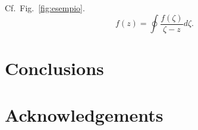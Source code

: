 \documentclass[MSc]{podunipdthesis}
\begin{document}
Cf.\ Fig.~\ref{fig:esempio}.
\lipsum[30]
\begin{equation}
f(z) = \oint \frac{f(\zeta)}{\zeta - z} d\zeta .
\end{equation}
\lipsum[10]

\chapter*{Conclusions}

\lipsum[20]




\chapter*{Acknowledgements}

\lipsum[20]
\end{document}
